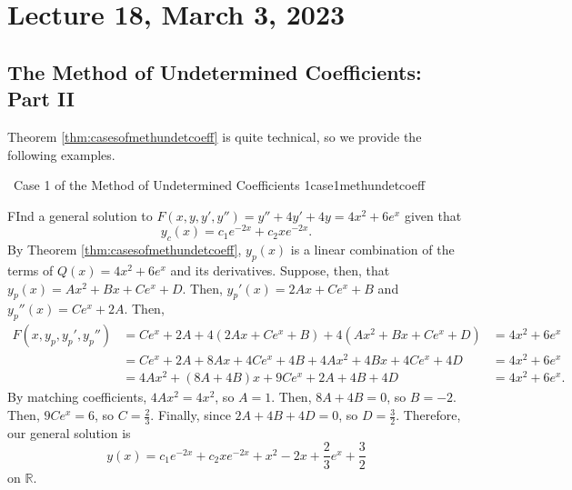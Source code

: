 \section{Lecture 18, March 3, 2023}

    \subsection{The Method of Undetermined Coefficients: Part II}

    Theorem \ref{thm:casesofmethundetcoeff} is quite technical, so we provide the following examples.
    \begin{example}{\Difficulty\,\Difficulty\,\,Case 1 of the Method of Undetermined Coefficients 1}{case1methundetcoeff}
        
        FInd a general solution to \(F(x,y,y',y'')=y''+4y'+4y=4x^2+6e^x\) given that 
        \begin{equation*}
            y_c(x)=c_1e^{-2x}+c_2xe^{-2x}.
        \end{equation*}
        By Theorem \ref{thm:casesofmethundetcoeff}, \(y_p(x)\) is a linear combination of the terms of \(Q(x)=4x^2+6e^x\) and its derivatives. Suppose, then, that \(y_p(x)=Ax^2+Bx+Ce^x+D\). Then, \(y_p'(x)=2Ax+Ce^x+B\) and \(y_p''(x)=Ce^x+2A\). Then,
        \begin{align*}
            F(x,y_p,y_p',y_p'')&=Ce^x+2A+4(2Ax+Ce^x+B)+4(Ax^2+Bx+Ce^x+D)&=4x^2+6e^x \\
            &=Ce^x+2A+8Ax+4Ce^x+4B+4Ax^2+4Bx+4Ce^x+4D&=4x^2+6e^x \\
            &=4Ax^2+(8A+4B)x+9Ce^x+2A+4B+4D&=4x^2+6e^x.
        \end{align*}
        By matching coefficients, \(4Ax^2=4x^2\), so \(A=1\). Then, \(8A+4B=0\), so \(B=-2\). Then, \(9Ce^x=6\), so \(C=\frac{2}{3}\). Finally, since \(2A+4B+4D=0\), so \(D=\frac{3}{2}\). Therefore, our general solution is
        \begin{equation*}
            y(x)=c_1e^{-2x}+c_2xe^{-2x}+x^2-2x+\frac{2}{3}e^x+\frac{3}{2}
        \end{equation*}
        on \(\mathbb{R}\).

    \end{example}
